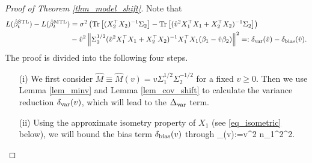 \begin{proof}[Proof of Theorem \ref{thm_model_shift}]
Note that 
\begin{align*}
L(\hat{\beta}_t^{\text{STL}}) - L(\hat{\beta}_t^{\text{MTL}}) &=\sigma^2 \left(  \operatorname{Tr}\left[(X_2^{\top}X_2)^{-1}\Sigma_2\right] -  \operatorname{Tr}\left[( \hat{v}^2 X_1^{\top}X_1 + X_2^{\top}X_2)^{-1} \Sigma_2\right]\right) \\
&- \hat{v}^2 \left\| \Sigma_2^{1/2}(\hat{v}^2 X_1^{\top}X_1 + X_2^{\top}X_2)^{-1} X_1^{\top}X_1 (\beta_1 - \hat{v} \beta_2) \right\|^2=:\delta_{\text{var}}(\hat v) - \delta_{\text{bias}}(\hat v).
\end{align*}
The proof is divided into the following four steps. 
\begin{itemize}
\item[(i)] We first consider $\hat M \equiv \hat M(v)= v\Sigma_1^{1/2}\Sigma_2^{-1/2}$ for a fixed $v\ge 0$. Then we use Lemma \ref{lem_minv} and Lemma \ref{lem_cov_shift} to calculate the variance reduction $\delta_{\text{var}}(v)$, which will lead to the $\Delta_{\text{var}}$ term.

\item[(ii)] Using the approximate isometry property of $X_1$ (see \eqref{eq_isometric} below), we will bound the bias term $ \delta_{\text{bias}}(v)$
through 
\be\label{deltabetapf}
\wt\delta_{\bias}(v):={v}^2 n_1^2^2.\ee


\end{itemize}
\end{proof}
